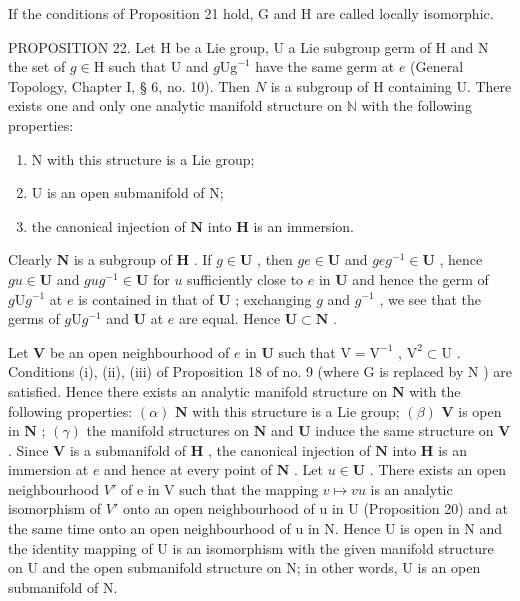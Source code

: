 If the conditions of Proposition 21 hold, G and H are called locally isomorphic.

PROPOSITION 22. Let H be a Lie group, U a Lie subgroup germ of H and N the set of \(g \in \mathrm{H}\) such that U and \(g\mathrm{Ug}^{-1}\) have the same germ at \(e\) (General Topology, Chapter I, § 6, no. 10). Then \(N\) is a subgroup of H containing U. There exists one and only one analytic manifold structure on \(\mathbb{N}\) with the following properties:

\begin{enumerate}
\def\labelenumi{(\roman{enumi})}
\item
  N with this structure is a Lie group;
\item
  U is an open submanifold of N;
\item
  the canonical injection of \(\mathbf{N}\) into \(\mathbf{H}\) is an immersion.
\end{enumerate}

Clearly \(\mathbf{N}\) is a subgroup of \(\mathbf{H}\) . If \(g \in \mathbf{U}\) , then \(ge \in \mathbf{U}\) and \(geg^{-1} \in \mathbf{U}\) , hence \(gu \in \mathbf{U}\) and \(gug^{-1} \in \mathbf{U}\) for \(u\) sufficiently close to \(e\) in \(\mathbf{U}\) and hence the germ of \(g\mathrm{U}g^{-1}\) at \(e\) is contained in that of \(\mathbf{U}\) ; exchanging \(g\) and \(g^{-1}\) , we see that the germs of \(g\mathrm{U}g^{-1}\) and \(\mathbf{U}\) at \(e\) are equal. Hence \(\mathbf{U} \subset \mathbf{N}\) .

Let \(\mathbf{V}\) be an open neighbourhood of \(e\) in \(\mathbf{U}\) such that \(\mathrm{V} = \mathrm{V}^{-1}\) , \(\mathrm{V}^2 \subset \mathrm{U}\) . Conditions (i), (ii), (iii) of Proposition 18 of no. 9 (where \(\mathrm{G}\) is replaced by \(\mathrm{N}\) ) are satisfied. Hence there exists an analytic manifold structure on \(\mathbf{N}\) with the following properties: \((\alpha)\) \(\mathbf{N}\) with this structure is a Lie group; \((\beta)\) \(\mathbf{V}\) is open in \(\mathbf{N}\) ; \((\gamma)\) the manifold structures on \(\mathbf{N}\) and \(\mathbf{U}\) induce the same structure on \(\mathbf{V}\) . Since \(\mathbf{V}\) is a submanifold of \(\mathbf{H}\) , the canonical injection of \(\mathbf{N}\) into \(\mathbf{H}\) is an immersion at \(e\) and hence at every point of \(\mathbf{N}\) . Let \(u \in \mathbf{U}\) . There exists an open neighbourhood \(V'\) of e in V such that the mapping \(v \mapsto vu\) is an analytic isomorphism of \(V'\) onto an open neighbourhood of u in U (Proposition 20) and at the same time onto an open neighbourhood of u in N. Hence U is open in N and the identity mapping of U is an isomorphism with the given manifold structure on U and the open submanifold structure on N; in other words, U is an open submanifold of N.

